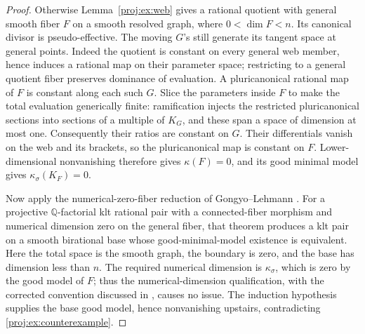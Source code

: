 \documentclass[11pt,letterpaper]{article}
\newcommand{\Q}{\mathbb{Q}}
\theoremstyle{definition}
\theoremstyle{remark}
\begin{document}
\begin{proof}
Otherwise Lemma~\ref{proj:ex:web} gives a rational quotient with general
smooth fiber \(F\) on a smooth resolved graph, where
\(0<\dim F<n\). Its canonical divisor is pseudo-effective.
The moving \(G\)'s still generate its tangent space at general
points. Indeed the quotient is constant on every general web
member, hence induces a rational map on their parameter space;
restricting to a general quotient fiber preserves dominance of
evaluation. A pluricanonical rational map of \(F\) is constant
along each such \(G\). Slice the parameters inside \(F\) to make
the total evaluation generically finite: ramification injects the
restricted pluricanonical sections into sections of a multiple of
\(K_G\), and these span a space of dimension at most one.
Consequently their ratios are constant on \(G\). Their
differentials vanish on the web and its brackets, so the
pluricanonical map is constant on \(F\). Lower-dimensional
nonvanishing therefore gives \(\kappa(F)=0\), and its good minimal
model gives \(\kappa_\sigma(K_F)=0\).

Now apply the numerical-zero-fiber reduction of
Gongyo--Lehmann \cite[Theorem~1.3 and Corollary~4.5]{Proj-GongyoLehmann2013}.
For a projective \(\Q\)-factorial klt rational pair with a
connected-fiber morphism and numerical dimension zero on the
general fiber, that theorem produces a klt pair on a smooth
birational base whose good-minimal-model existence is equivalent.
Here the total space is the smooth graph, the boundary is zero,
and the base has dimension less than \(n\). The required numerical
dimension is \(\kappa_\sigma\), which is zero by the good model of
\(F\); thus the numerical-dimension qualification, with the
corrected convention discussed in
\cite[Section~3 and Theorem~3.2]{Proj-Fujino2019Numerical},
causes no issue. The induction hypothesis supplies the base good
model, hence nonvanishing upstairs, contradicting
\eqref{proj:ex:counterexample}.
\end{proof}
\end{document}
